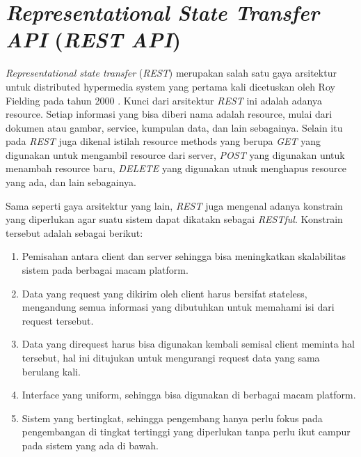 \section{\emph{Representational State Transfer API} (\emph{REST API})}
\vspace{1ex}

\emph{Representational state transfer} (\emph{REST}) merupakan salah satu gaya arsitektur untuk distributed hypermedia system yang pertama kali dicetuskan oleh Roy Fielding pada tahun 2000 \citep{rest}.
Kunci dari arsitektur \emph{REST} ini adalah adanya resource.
Setiap informasi yang bisa diberi nama adalah resource, mulai dari dokumen atau gambar, service, kumpulan data, dan lain sebagainya.
Selain itu pada \emph{REST} juga dikenal istilah resource methods yang berupa \emph{GET} yang digunakan untuk mengambil resource dari server, \emph{POST} yang digunakan untuk menambah resource baru, \emph{DELETE} yang digunakan utnuk menghapus resource yang ada, dan lain sebagainya.
\vspace{0.5ex}

Sama seperti gaya arsitektur yang lain, \emph{REST} juga mengenal adanya konstrain yang diperlukan agar suatu sistem dapat dikatakn sebagai \emph{RESTful}.
Konstrain tersebut adalah sebagai berikut:
\vspace{0.5ex}

\begin{enumerate}[nolistsep]

  \item Pemisahan antara client dan server sehingga bisa meningkatkan skalabilitas sistem pada berbagai macam platform.
  \vspace{0.5ex}

  \item Data yang request yang dikirim oleh client harus bersifat stateless, mengandung semua informasi yang dibutuhkan untuk memahami isi dari request tersebut.
  \vspace{0.5ex}

  \item Data yang direquest harus bisa digunakan kembali semisal client meminta hal tersebut, hal ini ditujukan untuk mengurangi request data yang sama berulang kali.
  \vspace{0.5ex}

  \item Interface yang uniform, sehingga bisa digunakan di berbagai macam platform.
  \vspace{0.5ex}

  \item Sistem yang bertingkat, sehingga pengembang hanya perlu fokus pada pengembangan di tingkat tertinggi yang diperlukan tanpa perlu ikut campur pada sistem yang ada di bawah.
  \vspace{0.5ex}

\end{enumerate}
\vspace{0.5ex}

